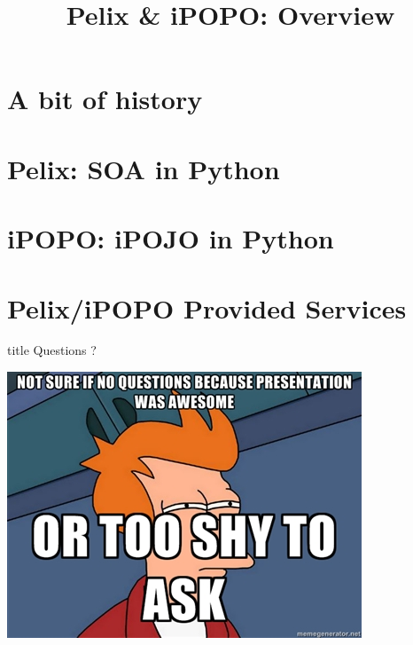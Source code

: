 \documentclass[table]{beamer}
\title[Pelix \& iPOPO]{Pelix \& iPOPO: Overview}
\begin{document}
\frame{\titlepage}

\section{A bit of history}


\section{Pelix: SOA in Python}


\section{iPOPO: iPOJO in Python}


\section{Pelix/iPOPO Provided Services}


\begin{frame}
  \vfill
  \centering
  \begin{beamercolorbox}[sep=8pt,center,shadow=true,rounded=true]{title}
    Questions ?\par%
  \end{beamercolorbox}
  \vspace{3ex}
  \includegraphics[width=.6\textwidth]{../imgs/questions_fry_2}
  \vfill
\end{frame}
\end{document}
